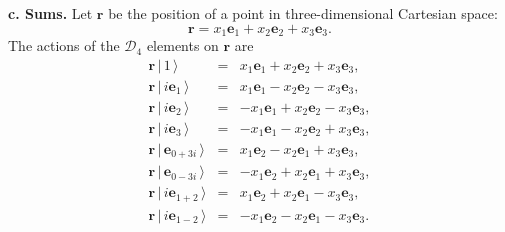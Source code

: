 \documentclass[11pt,twocolumn]{article}
\begin{document}
\textbf{c.  Sums.}  Let $\mathbf r$ be the position of a point in three-dimensional Cartesian space:
\begin{equation}
\label{eq:r is x_1e_1 + x_2e_2}
\mathbf r=x_1\mathbf e_1+x_2\mathbf e_2+x_3\mathbf e_3.
\end{equation}
The actions of the $\mathcal D_4$ elements on $\mathbf r$ are 
\begin{eqnarray}
\label{eq:r 1}
\mathbf r\,|\,1\,\rangle&=&x_1\mathbf e_1+x_2\mathbf e_2+x_3\mathbf e_3,\\
\label{eq:r ie_1}
\mathbf r\,|\,i\mathbf e_1\,\rangle&=&x_1\mathbf e_1-x_2\mathbf e_2-x_3\mathbf e_3,\\
\label{eq:r ie_2}
\mathbf r\,|\,i\mathbf e_2\,\rangle&=&-x_1\mathbf e_1+x_2\mathbf e_2-x_3\mathbf e_3,\\
\label{eq:r ie_3}
\mathbf r\,|\,i\mathbf e_3\,\rangle&=&-x_1\mathbf e_1-x_2\mathbf e_2+x_3\mathbf e_3,\\
\label{eq:r e_0+3i}
\mathbf r\,|\,\mathbf e_{0+3i}\,\rangle&=&x_1\mathbf e_2-x_2\mathbf e_1+x_3\mathbf e_3,\\
\label{eq:r e_0-3i}
\mathbf r\,|\,\mathbf e_{0-3i}\,\rangle&=&-x_1\mathbf e_2+x_2\mathbf e_1+x_3\mathbf e_3,\\
\label{eq:r ie_1+2}
\mathbf r\,|\,i\mathbf e_{1+2}\,\rangle&=&x_1\mathbf e_2+x_2\mathbf e_1-x_3\mathbf e_3,\\
\label{eq:r ie_1-2}
\mathbf r\,|\,i\mathbf e_{1-2}\,\rangle&=&-x_1\mathbf e_2-x_2\mathbf e_1-x_3\mathbf e_3.
\end{eqnarray}
\end{document}
